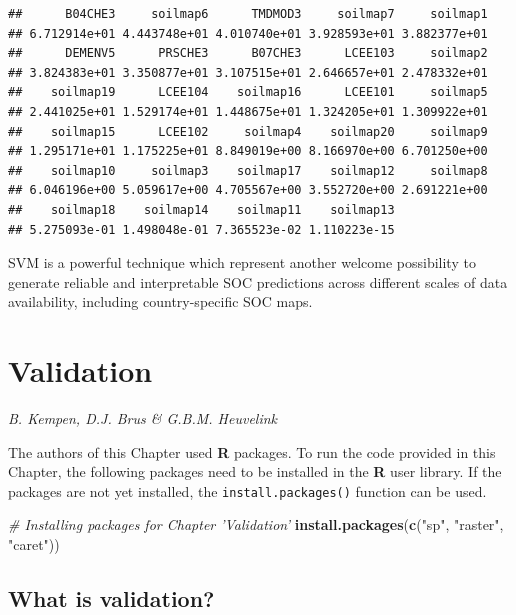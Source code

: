 \documentclass[10pt,b5paper,]{book}
\newenvironment{Shaded}{\begin{snugshade}}{\end{snugshade}}
\newcommand{\CommentTok}[1]{\textcolor[rgb]{0.56,0.35,0.01}{\textit{#1}}}
\newcommand{\KeywordTok}[1]{\textcolor[rgb]{0.13,0.29,0.53}{\textbf{#1}}}
\newcommand{\NormalTok}[1]{#1}
\newcommand{\StringTok}[1]{\textcolor[rgb]{0.31,0.60,0.02}{#1}}
\theoremstyle{definition}
\theoremstyle{definition}
\theoremstyle{definition}
\theoremstyle{remark}
\begin{document}
\begin{verbatim}
##      B04CHE3     soilmap6      TMDMOD3     soilmap7     soilmap1 
## 6.712914e+01 4.443748e+01 4.010740e+01 3.928593e+01 3.882377e+01 
##      DEMENV5      PRSCHE3      B07CHE3      LCEE103     soilmap2 
## 3.824383e+01 3.350877e+01 3.107515e+01 2.646657e+01 2.478332e+01 
##    soilmap19      LCEE104    soilmap16      LCEE101     soilmap5 
## 2.441025e+01 1.529174e+01 1.448675e+01 1.324205e+01 1.309922e+01 
##    soilmap15      LCEE102     soilmap4    soilmap20     soilmap9 
## 1.295171e+01 1.175225e+01 8.849019e+00 8.166970e+00 6.701250e+00 
##    soilmap10     soilmap3    soilmap17    soilmap12     soilmap8 
## 6.046196e+00 5.059617e+00 4.705567e+00 3.552720e+00 2.691221e+00 
##    soilmap18    soilmap14    soilmap11    soilmap13 
## 5.275093e-01 1.498048e-01 7.365523e-02 1.110223e-15
\end{verbatim}

SVM is a powerful technique which represent another welcome possibility
to generate reliable and interpretable SOC predictions across different
scales of data availability, including country-specific SOC maps.

\hypertarget{chvalidation}{%
\chapter{Validation}\label{chvalidation}}

\emph{B. Kempen, D.J. Brus \& G.B.M. Heuvelink}

The authors of this Chapter used \textbf{R} packages. To run the code
provided in this Chapter, the following packages need to be installed in
the \textbf{R} user library. If the packages are not yet installed, the
\texttt{install.packages()} function can be used.

\begin{Shaded}
\begin{Highlighting}[]
\CommentTok{# Installing packages for Chapter 'Validation'}
\KeywordTok{install.packages}\NormalTok{(}\KeywordTok{c}\NormalTok{(}\StringTok{"sp"}\NormalTok{, }\StringTok{"raster"}\NormalTok{, }\StringTok{"caret"}\NormalTok{))}
\end{Highlighting}
\end{Shaded}

\hypertarget{what-is-validation}{%
\section{What is validation?}\label{what-is-validation}}
\end{document}
